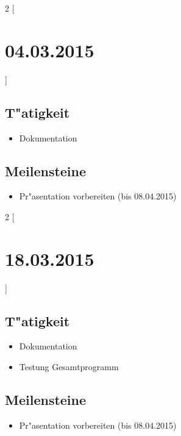 \documentclass[11pt,a4paper]{article}
\begin{document}
\begin{multicols}{2}
[\section*{  04.03.2015  }] 

\subsection*{T"atigkeit}
\begin{itemize}
\item Dokumentation
\end{itemize}

\columnbreak

\subsection*{Meilensteine}

\begin{itemize}
\item Pr"asentation vorbereiten (bis 08.04.2015)
\end{itemize}

\end{multicols}


\newpage


\begin{multicols}{2}
[\section*{  18.03.2015  }] 

\subsection*{T"atigkeit}
\begin{itemize}
\item Dokumentation
\item Testung Gesamtprogramm
\end{itemize}

\columnbreak

\subsection*{Meilensteine}

\begin{itemize}
\item Pr"asentation vorbereiten (bis 08.04.2015)
\end{itemize}

\end{multicols}
\end{document}
